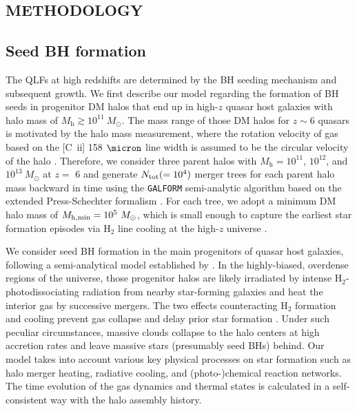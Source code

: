 \documentclass[twocolumn, twocolappendix]{aastex63}
\newcommand{\Msun}{M_\odot}
\newcommand{\Mh}{M_\mathrm{h}}
\begin{document}
\begin{CJK*}{UTF8}{gbsn}
\vspace{2mm}
\section{METHODOLOGY}\label{sec:method}

\vspace{2mm}
\subsection{Seed BH formation}\label{sec:seed}
The QLFs at high redshifts are determined by the BH seeding mechanism and subsequent growth. 
We first describe our model regarding the formation of BH seeds in progenitor DM halos 
that end up in high-$z$ quasar host galaxies with halo mass of $\Mh \gtrsim 10^{11}~\Msun$.
The mass range of those DM halos for $z\sim 6$ quasars is motivated by the halo mass measurement, 
where the rotation velocity of gas based on the [C~{\sc ii}] 158 $\micron$ line width is assumed to be the circular velocity of the halo
\citep{2002ApJ...578...90F,2013ApJ...773...44W,2019ApJ...872L..29S}.
Therefore, we consider three parent halos with $\Mh = 10^{11}$, $10^{12}$, and $10^{13} ~\Msun$ at $z=$ 6
and generate $N_{\rm tot} (= 10^4)$ merger trees for each parent halo mass backward in time using the {\tt GALFORM} 
semi-analytic algorithm based on the extended Press-Schechter formalism 
\citep{1974ApJ...187..425P,2000MNRAS.319..168C,2008MNRAS.383..557P}.
For each tree, we adopt a minimum DM halo mass of $M_{\rm h,min}=10^5~\Msun$, which is small enough to capture 
the earliest star formation episodes via H$_2$ line cooling at the high-$z$ universe \citep{1996ApJ...464..523H,1997ApJ...474....1T}.


We consider seed BH formation in the main progenitors of quasar host galaxies, following a semi-analytical model established by \citet{2021ApJ...917...60L}.
In the highly-biased, overdense regions of the universe, those progenitor halos are likely irradiated by intense H$_2$-photodissociating radiation 
from nearby star-forming galaxies and heat the interior gas by successive mergers. 
The two effects counteracting H$_2$ formation and cooling prevent gas collapse and delay prior star formation \citep[e.g.,][]{2014MNRAS.445..107V,2019Natur.566...85W}.
Under such peculiar circumstances, massive clouds collapse to the halo centers at high accretion rates and leave massive stars (presumably seed BHs) behind.
Our model takes into account various key physical processes on star formation such as halo merger heating, radiative cooling, and
(photo-)chemical reaction networks.
The time evolution of the gas dynamics and thermal states is calculated in a self-consistent way with the halo assembly history.



\end{CJK*}
\end{document}
